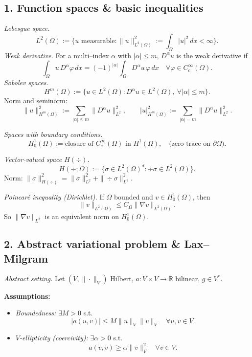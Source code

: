 \subsection*{1. Function spaces \& basic inequalities}
\emph{Lebesgue space.}
\[
    L^2(\Omega)
    := \{ u \text{ measurable} : \|u\|_{L^2(\Omega)}^2 := \int_\Omega |u|^2\,dx < \infty \}.
\]
\emph{Weak derivative.}
For a multi--index $\alpha$ with $|\alpha|\le m$, $D^\alpha u$ is the weak derivative if
\[
    \int_\Omega u\,D^\alpha\varphi\,dx
    = (-1)^{|\alpha|}\int_\Omega D^\alpha u\,\varphi\,dx
    \quad\forall \varphi\in C_c^\infty(\Omega).
\]
\emph{Sobolev spaces.}
\[
    H^m(\Omega)
    := \bigl\{ u\in L^2(\Omega) : D^\alpha u \in L^2(\Omega),\ \forall |\alpha|\le m\bigr\}.
\]
Norm and seminorm:
\[
    \|u\|_{H^m(\Omega)}^2 := \sum_{|\alpha|\le m}\|D^\alpha u\|_{L^2}^2,
    \qquad
    |u|_{H^m(\Omega)}^2 := \sum_{|\alpha|= m}\|D^\alpha u\|_{L^2}^2.
\]

\emph{Spaces with boundary conditions.}
\[
    H_0^1(\Omega)
    := \text{closure of } C_c^\infty(\Omega) \text{ in } H^1(\Omega),
    \quad\text{(zero trace on } \partial\Omega).
\]

\emph{Vector-valued space $H(\div)$.}
\[
    H(\div;\Omega)
    := \{\sigma\in L^2(\Omega)^d : \div\sigma \in L^2(\Omega)\}.
\]
Norm: $\|\sigma\|_{H(\div)}^2 = \|\sigma\|_{L^2}^2 + \|\div\sigma\|_{L^2}^2$.

\emph{Poincaré inequality (Dirichlet).}
If $\Omega$ bounded and $v\in H_0^1(\Omega)$, then
\[
    \|v\|_{L^2(\Omega)} \le C_\Omega \|\nabla v\|_{L^2(\Omega)}.
\]
So $\|\nabla v\|_{L^2}$ is an equivalent norm on $H_0^1(\Omega)$.

\subsection*{2. Abstract variational problem \& Lax--Milgram}

\emph{Abstract setting.} Let $(V,\|\cdot\|_V)$ Hilbert, $a:V\times V\to\mathbb{R}$ bilinear, $g\in V^\ast$.

\textbf{Assumptions:}
\begin{itemize}
    \item \emph{Boundedness:} $\exists M>0$ s.t.
          \[
              |a(u,v)| \le M \|u\|_V\|v\|_V\quad\forall u,v\in V.
          \]
    \item \emph{$V$-ellipticity (coercivity):} $\exists \alpha>0$ s.t.
          \[
              a(v,v) \ge \alpha \|v\|_V^2\quad\forall v\in V.
          \]
\end{itemize}

